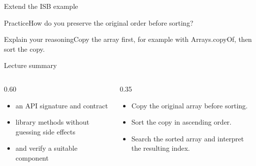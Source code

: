 \documentclass[10pt,aspectratio=169]{beamer}
\begin{document}
\begin{frame}[fragile,t]{Extend the ISB example}
\begin{alertblock}{Practice}How do you preserve the original order before sorting?\end{alertblock}\vspace{3mm}\begin{exampleblock}{Explain your reasoning}Copy the array first, for example with Arrays.copyOf, then sort the copy.\end{exampleblock}
\end{frame}
\begin{frame}[fragile,t]{Lecture summary}
\begin{columns}[T,onlytextwidth]\begin{column}{0.60\textwidth}
\begin{itemize}
\item an API signature and contract
\item library methods without guessing side effects
\item and verify a suitable component
\end{itemize}
\end{column}\begin{column}{0.35\textwidth}\small
\begin{itemize}
\item Copy the original array before sorting.
\item Sort the copy in ascending order.
\item Search the sorted array and interpret the resulting index.
\end{itemize}
\end{column}\end{columns}
\end{frame}
\end{document}
